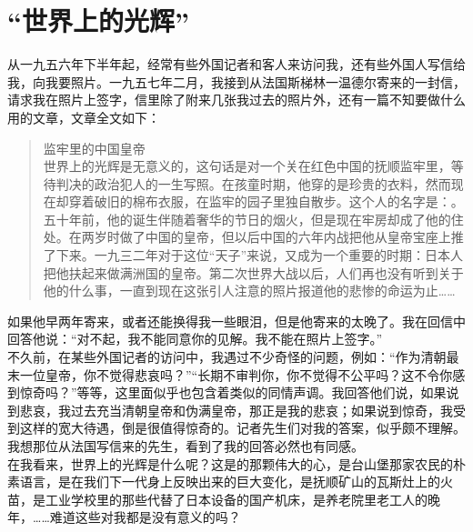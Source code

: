 \fancyhead[RO]{\thepage} %
\fancyhead[LE]{\thepage} %
\chapter*{“世界上的光辉”}
从一九五六年下半年起，经常有些外国记者和客人来访问我，还有些外国人写信给我，向我要照片。一九五七年二月，我接到从法国斯梯林一温德尔寄来的一封信，请求我在照片上签字，信里除了附来几张我过去的照片外，还有一篇不知要做什么用的文章，文章全文如下：\\

\begin{quote}
	监牢里的中国皇帝\\

世界上的光辉是无意义的，这句话是对一个关在红色中国的抚顺监牢里，等待判决的政治犯人的一生写照。在孩童时期，他穿的是珍贵的衣料，然而现在却穿着破旧的棉布衣服，在监牢的园子里独自散步。这个人的名字是：。五十年前，他的诞生伴随着奢华的节日的烟火，但是现在牢房却成了他的住处。在两岁时做了中国的皇帝，但以后中国的六年内战把他从皇帝宝座上推了下来。一九三二年对于这位“天子”来说，又成为一个重要的时期：日本人把他扶起来做满洲国的皇帝。第二次世界大战以后，人们再也没有听到关于他的什么事，一直到现在这张引人注意的照片报道他的悲惨的命运为止……\\
\end{quote}

如果他早两年寄来，或者还能换得我一些眼泪，但是他寄来的太晚了。我在回信中回答他说：“对不起，我不能同意你的见解。我不能在照片上签字。”\\

不久前，在某些外国记者的访问中，我遇过不少奇怪的问题，例如：“作为清朝最末一位皇帝，你不觉得悲哀吗？”“长期不审判你，你不觉得不公平吗？这不令你感到惊奇吗？”等等，这里面似乎也包含着类似的同情声调。我回答他们说，如果说到悲哀，我过去充当清朝皇帝和伪满皇帝，那正是我的悲哀；如果说到惊奇，我受到这样的宽大待遇，倒是很值得惊奇的。记者先生们对我的答案，似乎颇不理解。我想那位从法国写信来的先生，看到了我的回答必然也有同感。\\

在我看来，世界上的光辉是什么呢？这是的那颗伟大的心，是台山堡那家农民的朴素语言，是在我们下一代身上反映出来的巨大变化，是抚顺矿山的瓦斯灶上的火苗，是工业学校里的那些代替了日本设备的国产机床，是养老院里老工人的晚年，……难道这些对我都是没有意义的吗？\\

